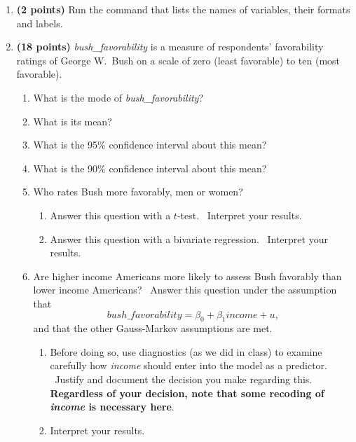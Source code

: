\documentclass[11pt]{article}
\begin{document}
\begin{enumerate}
\item \textbf{(2 points) }Run the command that lists the names of variables,
their formats and labels.\bigskip

\item \textbf{(18 points) }\textit{bush\_favorability }is a measure of
respondents' favorability ratings of George W.\ Bush on a scale of zero
(least favorable) to ten (most favorable). \ 

\begin{enumerate}
\item What is the mode of \textit{bush\_favorability}? \ 

\item What is its mean?

\item What is the 95\% confidence interval about this mean?

\item What is the 90\% confidence interval about this mean?

\item Who rates Bush more favorably, men or women?

\begin{enumerate}
\item Answer this question with a $t$-test. \ Interpret your results.

\item Answer this question with a bivariate regression. \ Interpret your
results.
\end{enumerate}

\item Are higher income Americans more likely to assess Bush favorably than
lower income Americans? \ Answer this question under the assumption that 
\begin{equation*}
bush\_favorability=\beta _{0}+\beta _{1}income+u,
\end{equation*}%
and that the other Gauss-Markov assumptions are met. \ 

\begin{enumerate}
\item Before doing so, use diagnostics (as we did in class) to examine
carefully how \textit{income }should enter into the model as a predictor. \
Justify and document the decision you make regarding this. \ \textbf{%
Regardless of your decision, note that some recoding of \textit{income }is
necessary here}.

\item Interpret your results.\newpage
\end{enumerate}
\end{enumerate}


\end{enumerate}
\end{document}
